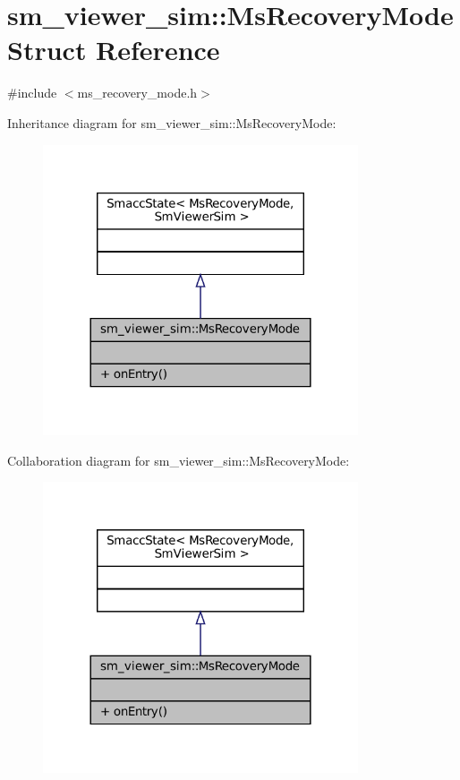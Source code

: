 \hypertarget{structsm__viewer__sim_1_1MsRecoveryMode}{}\section{sm\+\_\+viewer\+\_\+sim\+:\+:Ms\+Recovery\+Mode Struct Reference}
\label{structsm__viewer__sim_1_1MsRecoveryMode}


{\ttfamily \#include $<$ms\+\_\+recovery\+\_\+mode.\+h$>$}



Inheritance diagram for sm\+\_\+viewer\+\_\+sim\+:\+:Ms\+Recovery\+Mode\+:
\nopagebreak
\begin{figure}[H]
\begin{center}
\leavevmode
\includegraphics[width=264pt]{structsm__viewer__sim_1_1MsRecoveryMode__inherit__graph}
\end{center}
\end{figure}


Collaboration diagram for sm\+\_\+viewer\+\_\+sim\+:\+:Ms\+Recovery\+Mode\+:
\nopagebreak
\begin{figure}[H]
\begin{center}
\leavevmode
\includegraphics[width=264pt]{structsm__viewer__sim_1_1MsRecoveryMode__coll__graph}
\end{center}
\end{figure}
